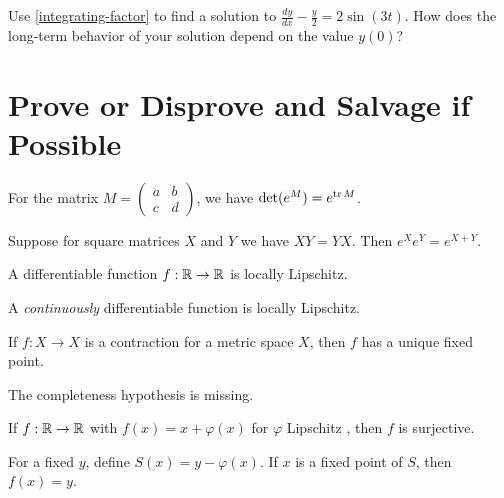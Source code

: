 \documentclass{homework}
\begin{document}
\begin{problem}Use \ref{integrating-factor} to find a solution to
  \(
    \displaystyle\frac{dy}{dx} - \displaystyle\frac{y}{2} = 2 \sin (3t).
  \)
  How does the long-term behavior of your solution depend on the value $y(0)$?
\end{problem}


\section{Prove or Disprove and Salvage if Possible}

\begin{problem}
  For the matrix $M = \begin{pmatrix} a & b \\ c & d \end{pmatrix}$, we have
    $\det (e^M) = e^{\operatorname{tr} M}$.
\end{problem}

\begin{problem}
  Suppose for square matrices $X$ and $Y$ we have $XY = YX$.  Then $e^X e^Y = e^{X+Y}$.
\end{problem}

\begin{problem}
  A differentiable function $f : \mathbb{R} \to \mathbb{R}$ is locally Lipschitz.
\end{problem}

\begin{solution}
  A \textit{continuously} differentiable function is locally Lipschitz.
\end{solution}

\begin{problem}
  If $f : X \to X$ is a contraction for a metric space $X$, then
  $f$ has a unique fixed point.
\end{problem}

\begin{solution}
  The completeness hypothesis is missing.
\end{solution}

\begin{problem}
  If $f : \mathbb{R} \to \mathbb{R}$ with $f(x) = x + \varphi(x)$ for $\varphi$ Lipschitz , then $f$ is surjective.
\end{problem}

\begin{solution}
  For a fixed $y$, define $S(x) = y - \varphi(x)$.  If $x$ is a fixed point of $S$, then $f(x) = y$.
\end{solution}
\end{document}
